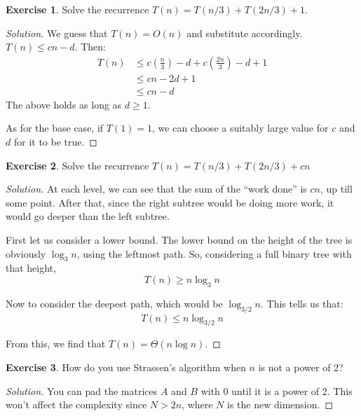 \documentclass[12pt,letterpaper]{article}
\theoremstyle{definition}
\newtheorem*{exercise}{Exercise}
\newenvironment{solution}
  {\renewcommand\qedsymbol{$\blacksquare$}\begin{proof}[Solution]}
  {\end{proof}}
\begin{document}
\begin{exercise}
  Solve the recurrence $T(n) = T(n/3) + T(2n/3) + 1$.
\end{exercise}
\begin{solution}
  We guess that $T(n) = O(n)$ and substitute accordingly. $T(n) \leq cn-d$. Then:
  \begin{align*}
    T(n) & \leq c(\frac{n}{3}) - d + c(\frac{2n}{3})  - d + 1 \\
         &\leq cn -2d + 1 \\
         &\leq cn-d
  \end{align*}
  The above holds as long as $d \geq 1$.

  As for the base case, if $T(1) = 1$, we can choose a suitably large value for $c$ and $d$ for it to be true.
\end{solution}

\begin{exercise}
  Solve the recurrence $T(n) = T(n/3) + T(2n/3) + cn$
\end{exercise}
\begin{solution}
  At each level, we can see that the sum of the ``work done''  is $cn$, up till some point. After that, since the right subtree would be doing more work, it would go deeper than the left subtree.

  First let us consider a lower bound. The lower bound on the height of the tree is obviously $\log_3n$, using the leftmost path. So, considering a full binary tree with that height,
  \[T(n) \geq n \log_3n\]

  Now to consider the deepest path, which would be $\log_{3/2}n$. This tells us that:
  \[T(n) \leq n \log_{3/2}n\]

  From this, we find that $T(n) = \Theta(n \log n)$.
\end{solution}

\begin{exercise}
  How do you use Strassen's algorithm when $n$ is not a power of 2?
\end{exercise}
\begin{solution}
  You can pad the matrices $A$ and $B$ with 0 until it is a power of 2. This won't affect the complexity since $N > 2n$, where $N$ is the new dimension.
\end{solution}
\end{document}
